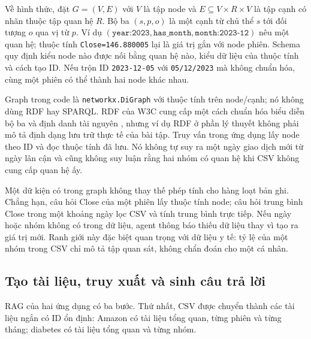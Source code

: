 \documentclass[12pt,a4paper]{report}
\begin{document}
Về hình thức, đặt $G=(V,E)$ với $V$ là tập node và $E\subseteq V\times R\times V$ là tập cạnh có nhãn thuộc tập quan hệ $R$. Bộ ba $(s,p,o)$ là một cạnh từ chủ thể $s$ tới đối tượng $o$ qua vị từ $p$. Ví dụ $(\texttt{year:2023},\texttt{has\_month},\texttt{month:2023-12})$ nêu một quan hệ; thuộc tính \texttt{Close=146.880005} lại là giá trị gắn với node phiên. Schema quy định kiểu node nào được nối bằng quan hệ nào, kiểu dữ liệu của thuộc tính và cách tạo ID. Nếu trộn ID \texttt{2023-12-05} với \texttt{05/12/2023} mà không chuẩn hóa, cùng một phiên có thể thành hai node khác nhau.

Graph trong code là \texttt{networkx.DiGraph} với thuộc tính trên node/cạnh; nó không dùng RDF hay SPARQL. RDF của W3C cung cấp một cách chuẩn hóa biểu diễn bộ ba và định danh tài nguyên \cite{essay03-w3c}, nhưng ví dụ RDF ở phần lý thuyết không phải mô tả định dạng lưu trữ thực tế của bài tập. Truy vấn trong ứng dụng lấy node theo ID và đọc thuộc tính đã lưu. Nó không tự suy ra một ngày giao dịch mới từ ngày lân cận và cũng không suy luận rằng hai nhóm có quan hệ khi CSV không cung cấp quan hệ ấy.

Một dữ kiện có trong graph không thay thế phép tính cho hàng loạt bản ghi. Chẳng hạn, câu hỏi Close
của một phiên lấy thuộc tính node; câu hỏi trung bình Close trong một khoảng ngày lọc CSV và tính
trung bình trực tiếp. Nếu ngày hoặc nhóm không có trong dữ liệu, agent thông báo thiếu dữ liệu
thay vì tạo ra giá trị mới. Ranh giới này đặc biệt quan trọng với dữ liệu y tế: tỷ lệ của một nhóm
trong CSV chỉ mô tả tập quan sát, không chẩn đoán cho một cá nhân.

\subsection{Tạo tài liệu, truy xuất và sinh câu trả lời}
RAG của hai ứng dụng có ba bước. Thứ nhất, CSV được chuyển thành các tài liệu ngắn có ID ổn định:
Amazon có tài liệu tổng quan, từng phiên và từng tháng; diabetes có tài liệu tổng quan và từng nhóm.
\end{document}
